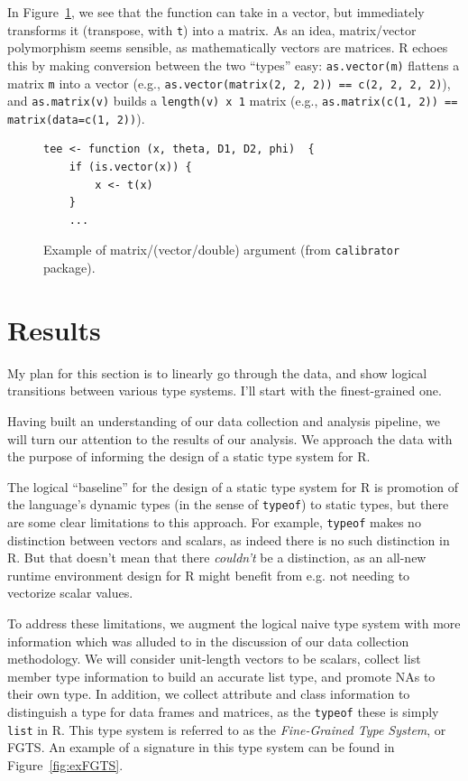 \documentclass[acmsmall,10pt,review,anonymous]{acmart}\settopmatter{printfolios=true,printccs=false,printacmref=false}
\newcommand{\code}[1]{\lstinline|#1|\xspace}
\begin{document}
In Figure~\ref{fig:matvec}, we see that the function can take in a vector, but immediately transforms it (transpose, with {\tt t}) into a matrix.
As an idea, matrix/vector polymorphism seems sensible, as mathematically vectors are matrices.
R echoes this by making conversion between the two ``types'' easy:
\code{as.vector(m)} flattens a matrix \code{m} into a vector (e.g., \code{as.vector(matrix(2, 2, 2)) == c(2, 2, 2, 2)}), and \code{as.matrix(v)} builds a {\tt length(v) x 1} matrix (e.g., \code{as.matrix(c(1, 2)) == matrix(data=c(1, 2))}).

\begin{figure}[!hb]{\small\begin{lstlisting}[style=R]
tee <- function (x, theta, D1, D2, phi)  {
    if (is.vector(x)) {
        x <- t(x)
    }
    ...
\end{lstlisting}}\caption{Example of matrix/(vector/double) argument (from {\tt calibrator} package).}\label{fig:matvec}\end{figure}

%
%
%
%
%
%
\section{Results}\label{sec:results}

 My plan for this section is to linearly go through the
data, and show logical transitions between various type systems.  I'll start
with the finest-grained one.

Having built an understanding of our data collection and analysis
pipeline, we will turn our attention to the results of our analysis.  We
approach the data with the purpose of informing the design of a static type
system for R. 

The logical ``baseline'' for the design of a static type system for R is
promotion of the language's dynamic types (in the sense of \code{typeof}) to
static types, but there are some clear limitations to this approach.  For
example, \code{typeof} makes no distinction between vectors and scalars, as
indeed there is no such distinction in R.  But that doesn't mean that there
{\it couldn't} be a distinction, as an all-new runtime environment design
for R might benefit from e.g. not needing to vectorize scalar values.

To address these limitations, we augment the logical naive type system with
more information which was alluded to in the discussion of our data
collection methodology.  We will consider unit-length vectors to be scalars,
collect list member type information to build an accurate list type, and
promote NAs to their own type.  In addition, we collect attribute and class
information to distinguish a type for data frames and matrices, as the
\code{typeof} these is simply {\tt list} in R.  This type system is referred
to as the {\it Fine-Grained Type System}, or FGTS.  An example of a signature in
this type system can be found in Figure~\ref{fig:exFGTS}.
\end{document}
